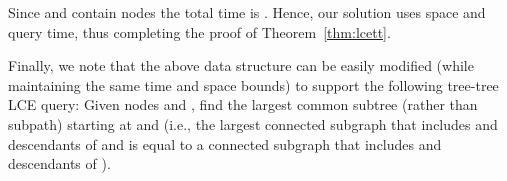 \documentclass [10pt]{article}
\begin{document}
Since  and  contain  nodes the total time is . Hence, our solution uses  space and  query time, thus completing the proof of Theorem~\ref{thm:lcett}.

\medskip 

\noindent Finally, we note that the above data structure can be easily modified (while maintaining the same time and space bounds) to support the following tree-tree LCE query:
Given nodes  and , find the largest common subtree (rather than subpath) starting at  and  (i.e., the largest connected subgraph that includes  and  descendants of  and is equal to a connected subgraph that includes  and  descendants of ).



\end{document}
